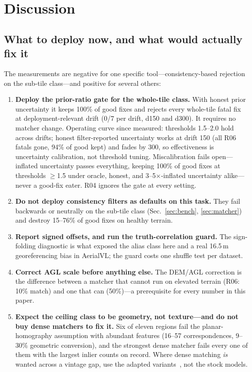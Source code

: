 \documentclass[journal]{IEEEtran}
\begin{document}
\section{Discussion}

\subsection{What to deploy now, and what would actually fix it}
The measurements are negative for one specific tool---consistency-based rejection on the sub-tile class---and positive for several others:
\begin{enumerate}
\item \textbf{Deploy the prior-ratio gate for the whole-tile class.} With honest prior uncertainty it keeps 100\% of good fixes and rejects every whole-tile fatal fix at deployment-relevant drift (0/7 per drift, d150 and d300). It requires no matcher change. Operating curve since measured: thresholds 1.5--2.0 hold across drifts; honest filter-reported uncertainty works at drift 150 (all R06 fatals gone, 94\% of good kept) and fades by 300, so effectiveness is uncertainty calibration, not threshold tuning. Miscalibration fails open---inflated uncertainty passes everything, keeping 100\% of good fixes at thresholds $\geq$1.5 under oracle, honest, and 3--5$\times$-inflated uncertainty alike---never a good-fix eater. R04 ignores the gate at every setting.
\item \textbf{Do not deploy consistency filters as defaults on this task.} They fail backwards or neutrally on the sub-tile class (Sec.~\ref{sec:bench}, \ref{sec:matcher}) and destroy 15--76\% of good fixes on healthy terrain.
\item \textbf{Report signed offsets, and run the truth-correlation guard.} The sign-folding diagnostic is what exposed the alias class here and a real 16.5\,m georeferencing bias in AerialVL; the guard costs one shuffle test per dataset.
\item \textbf{Correct AGL scale before anything else.} The DEM/AGL correction is the difference between a matcher that cannot run on elevated terrain (R06: 10\% match) and one that can (50\%)---a prerequisite for every number in this paper.
\item \textbf{Expect the ceiling class to be geometry, not texture---and do not buy dense matchers to fix it.} Six of eleven regions fail the planar-homography assumption with abundant features (16--57 correspondences, 9--30\% geometric conversion), and the strongest dense matcher fails every one of them with the largest inlier counts on record. Where dense matching \emph{is} wanted across a vintage gap, use the adapted variants~\cite{satroma,loretta}, not the stock models.

\end{enumerate}
\end{document}
